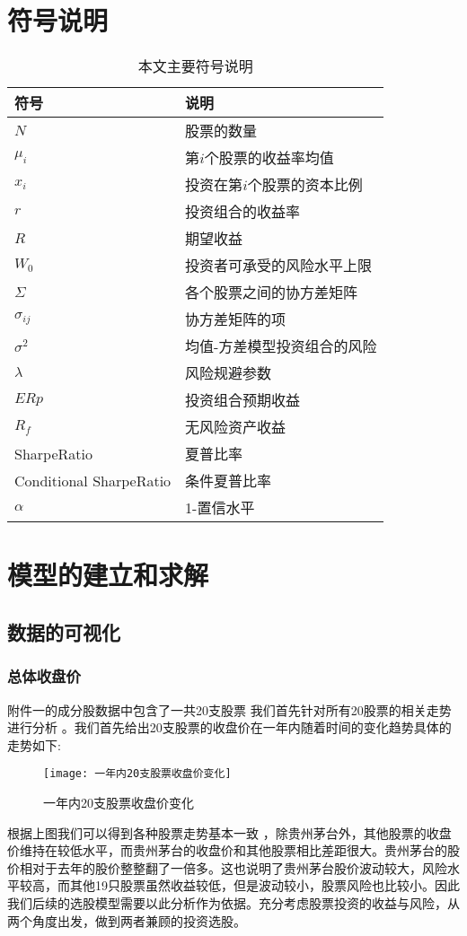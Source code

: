 \documentclass[withoutpreface,bwprint]{cumcmthesis} %
\begin{document}
	\section{符号说明}
	\begin{table}[htbp]
		\centering
		\caption{本文主要符号说明}
		\begin{tabular}{ll}
			\toprule[1.5pt]
			符号    & 说明 \\
			\midrule
			$N     		$	& 股票的数量 \\
			$\mu_i   		$	& 第$i$个股票的收益率均值 \\
			$x_i    		$	& 投资在第$i$个股票的资本比例 \\
			$r     		$	& 投资组合的收益率 \\
			$R     		$	& 期望收益 \\
			$W_0   		$	& 投资者可承受的风险水平上限   \\
			$\Sigma   		$	& 各个股票之间的协方差矩阵 \\
			$\sigma_{ij}	$	& 协方差矩阵的项 \\
			$\sigma^2$ 		& 均值-方差模型投资组合的风险 \\
			$\lambda$ 			& 风险规避参数 \\
			$ERp   	$	& 投资组合预期收益 \\
			$R_f  		$	& 无风险资产收益 \\
			SharpeRatio 	& 夏普比率 \\
			Conditional SharpeRatio & 条件夏普比率 \\
			$\alpha$ & 1-置信水平 \\
			\bottomrule[1.5pt]
		\end{tabular}%
		\label{tab:addlabel}%
	\end{table}%
	
	
	\section{模型的建立和求解}
	
	\subsection{数据的可视化}
	\subsubsection{总体收盘价}
	附件一的成分股数据中包含了一共20支股票 我们首先针对所有20股票的相关走势
	进行分析 。我们首先给出20支股票的收盘价在一年内随着时间的变化趋势具体的走势如下:
	 \begin{figure}[H]
		\centering
		\texttt{[image: 一年内20支股票收盘价变化]}
		\caption{一年内20支股票收盘价变化}
		\label{一年内20支股票收盘价变化}
	\end{figure}
根据上图我们可以得到各种股票走势基本一致 ，除贵州茅台外，其他股票的收盘价维持在较低水平，而贵州茅台的收盘价和其他股票相比差距很大。贵州茅台的股价相对于去年的股价整整翻了一倍多。这也说明了贵州茅台股价波动较大，风险水平较高，而其他19只股票虽然收益较低，但是波动较小，股票风险也比较小。因此我们后续的选股模型需要以此分析作为依据。充分考虑股票投资的收益与风险，从两个角度出发，做到两者兼顾的投资选股。
\end{document}
